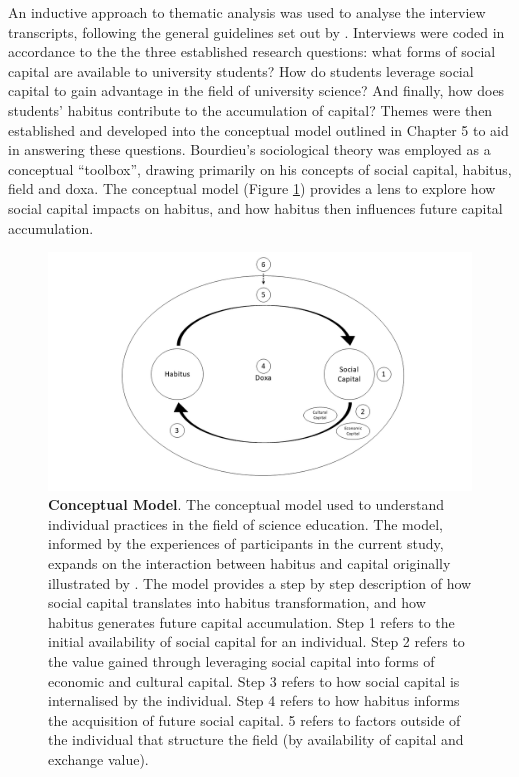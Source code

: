An inductive approach to thematic analysis was used to analyse the interview transcripts, following the general guidelines set out by \cite{Braun_2006}. Interviews were coded in accordance to the the three established research questions:  what forms of social capital are available to university students? How do students leverage social capital to gain advantage in the field of university science? And finally, how does students' habitus contribute to the accumulation of capital? Themes were then established and developed into the conceptual model outlined in Chapter 5 to aid in answering these questions. Bourdieu's sociological theory was employed as a conceptual ``toolbox'', drawing primarily on his concepts of social capital, habitus, field and doxa. The conceptual model (Figure \ref{fig:HabitusSocCap_TheoreticalModel_C6}) provides a lens to explore how social capital impacts on habitus, and how habitus then influences future capital accumulation. 

\begin{figure}[ht]
\centering
\includegraphics[width=\textwidth]{C5 - Understanding Capital Accumulation/HabitusSocCap_TheoreticalModel.png}
\caption{\label{fig:HabitusSocCap_TheoreticalModel_C6}\textbf{Conceptual Model}. The conceptual model used to understand individual practices in the field of science education. The model, informed by the experiences of participants in the current study, expands on the interaction between habitus and capital originally illustrated by \cite{Bourdieu1984}. The model provides a step by step description of how social capital translates into habitus transformation, and how habitus generates future capital accumulation. Step 1 refers to the initial availability of social capital for an individual. Step 2 refers to the value gained through leveraging social capital into forms of economic and cultural capital. Step 3 refers to how social capital is internalised by the individual. Step 4 refers to how habitus informs the acquisition of future social capital. 5 refers to factors outside of the individual that structure the field (by availability of capital and exchange value).}
\end{figure}


